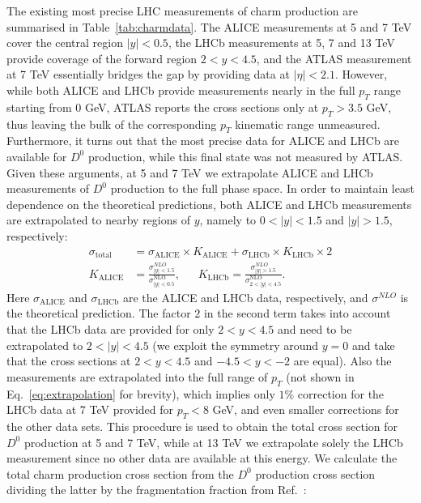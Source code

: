 \documentclass[12pt,a4paper]{article}
\newcommand{\dz}{\ensuremath{D^0}\xspace}
\begin{document}
The existing most precise LHC measurements of charm production are summarised in Table~\ref{tab:charmdata}. The ALICE measurements at 5 and 7 TeV cover the central region $|y| < 0.5$, the LHCb measurements at 5, 7 and 13 TeV provide coverage of the forward region $2<y<4.5$, and the ATLAS measurement at 7 TeV essentially bridges the gap by providing data at $|\eta| < 2.1$. However, while both ALICE and LHCb provide measurements nearly in the full $p_T$ range starting from 0 GeV, ATLAS reports the cross sections only at $p_T > 3.5$ GeV, thus leaving the bulk of the corresponding $p_T$ kinematic range unmeasured. Furthermore, it turns out that the most precise data for ALICE and LHCb are available for \dz production, while this final state was not measured by ATLAS. Given these arguments, at 5 and 7 TeV we extrapolate ALICE and LHCb measurements of \dz production to the full phase space. In order to maintain least dependence on the theoretical predictions, both ALICE and LHCb measurements are extrapolated to nearby regions of $y$, namely to $0<|y|<1.5$ and $|y|>1.5$, respectively:
\begin{equation}
\begin{aligned}
\sigma_{\textrm{total}} &= \sigma_{\textrm{ALICE}} \times K_{\textrm{ALICE}} + \sigma_{\textrm{LHCb}} \times K_{\textrm{LHCb}} \times 2 \\
K_{\textrm{ALICE}} &= \frac{\sigma^{NLO}_{|y|<1.5}}{\sigma^{\textrm{NLO}}_{|y|<0.5}},~~~~~~~
K_{\textrm{LHCb}} = \frac{\sigma^{NLO}_{|y|>1.5}}{\sigma^{\textrm{NLO}}_{2<|y|<4.5}}.
\end{aligned}
\label{eq:extrapolation}
\end{equation}
Here $\sigma_{\textrm{ALICE}}$ and $\sigma_{\textrm{LHCb}}$ are the ALICE and LHCb data, respectively, and $\sigma^{NLO}$ is the theoretical prediction. 
The factor $2$ in the second term takes into account that the LHCb data are provided for only $2<y<4.5$ and need to be extrapolated to $2<|y|<4.5$ (we exploit the symmetry around $y=0$ and take that the cross sections at $2<y<4.5$ and $-4.5<y<-2$ are equal).
 Also the measurements are extrapolated into the full range of $p_T$ (not shown in Eq.~\ref{eq:extrapolation} for brevity), which implies only $1\%$ correction for the LHCb data at 7 TeV provided for $p_T < 8$ GeV, and even smaller corrections for the other data sets. This procedure is used to obtain the total cross section for \dz production at 5 and 7 TeV, while at 13 TeV we extrapolate solely the LHCb measurement since no other data are available at this energy. We calculate the total charm production cross section from the \dz production cross section dividing the latter by the fragmentation fraction from Ref.~\cite{Lisovyi:2015uqa}:
\end{document}

